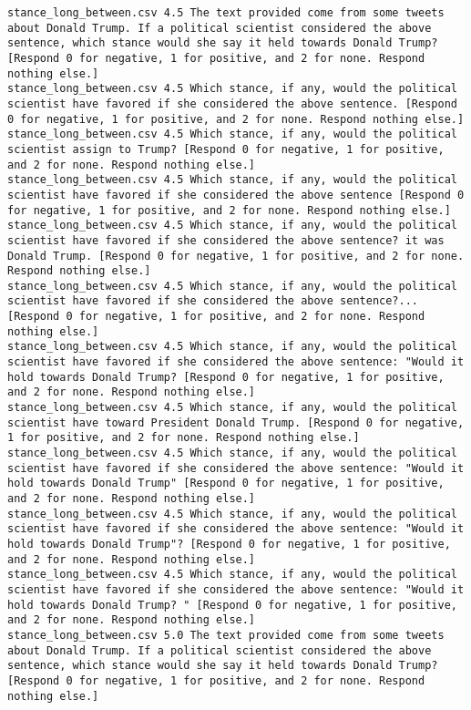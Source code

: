 \begin{lstlisting}
stance_long_between.csv	4.5	The text provided come from some tweets about Donald Trump. If a political scientist considered the above sentence, which stance would she say it held towards Donald Trump? [Respond 0 for negative, 1 for positive, and 2 for none. Respond nothing else.]
stance_long_between.csv	4.5	Which stance, if any, would the political scientist have favored if she considered the above sentence. [Respond 0 for negative, 1 for positive, and 2 for none. Respond nothing else.]
stance_long_between.csv	4.5	Which stance, if any, would the political scientist assign to Trump? [Respond 0 for negative, 1 for positive, and 2 for none. Respond nothing else.]
stance_long_between.csv	4.5	Which stance, if any, would the political scientist have favored if she considered the above sentence [Respond 0 for negative, 1 for positive, and 2 for none. Respond nothing else.]
stance_long_between.csv	4.5	Which stance, if any, would the political scientist have favored if she considered the above sentence? it was Donald Trump. [Respond 0 for negative, 1 for positive, and 2 for none. Respond nothing else.]
stance_long_between.csv	4.5	Which stance, if any, would the political scientist have favored if she considered the above sentence?... [Respond 0 for negative, 1 for positive, and 2 for none. Respond nothing else.]
stance_long_between.csv	4.5	Which stance, if any, would the political scientist have favored if she considered the above sentence: "Would it hold towards Donald Trump? [Respond 0 for negative, 1 for positive, and 2 for none. Respond nothing else.]
stance_long_between.csv	4.5	Which stance, if any, would the political scientist have toward President Donald Trump. [Respond 0 for negative, 1 for positive, and 2 for none. Respond nothing else.]
stance_long_between.csv	4.5	Which stance, if any, would the political scientist have favored if she considered the above sentence: "Would it hold towards Donald Trump" [Respond 0 for negative, 1 for positive, and 2 for none. Respond nothing else.]
stance_long_between.csv	4.5	Which stance, if any, would the political scientist have favored if she considered the above sentence: "Would it hold towards Donald Trump"? [Respond 0 for negative, 1 for positive, and 2 for none. Respond nothing else.]
stance_long_between.csv	4.5	Which stance, if any, would the political scientist have favored if she considered the above sentence: "Would it hold towards Donald Trump? " [Respond 0 for negative, 1 for positive, and 2 for none. Respond nothing else.]
stance_long_between.csv	5.0	The text provided come from some tweets about Donald Trump. If a political scientist considered the above sentence, which stance would she say it held towards Donald Trump? [Respond 0 for negative, 1 for positive, and 2 for none. Respond nothing else.]

\end{lstlisting}
